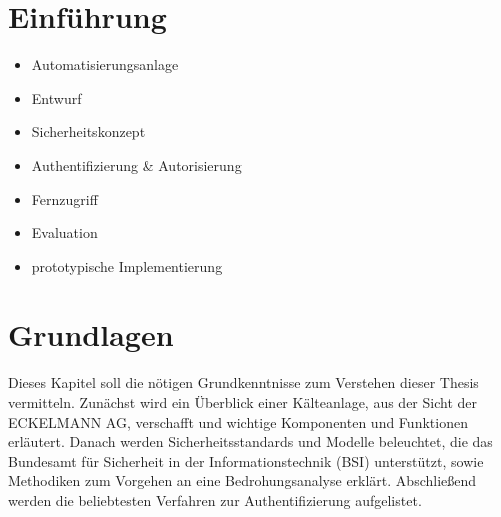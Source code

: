 \documentclass[11pt,a4paper]{report}
\begin{document}

\tableofcontents
\clearpage 


\chapter{Einführung} \label{chap:intro}

\begin{itemize}
\item Automatisierungsanlage
\item Entwurf 
\item Sicherheitskonzept
\item Authentifizierung \& Autorisierung
\item Fernzugriff
\item Evaluation
\item prototypische Implementierung
\end{itemize}

\chapter{Grundlagen} \label{chap:basics}

Dieses Kapitel soll die nötigen Grundkenntnisse zum Verstehen dieser Thesis vermitteln. Zunächst wird ein Überblick einer Kälteanlage, aus der Sicht der ECKELMANN AG, verschafft und wichtige Komponenten und Funktionen erläutert. Danach werden Sicherheitsstandards und Modelle beleuchtet, die das Bundesamt für Sicherheit in der Informationstechnik (BSI) unterstützt, sowie Methodiken zum Vorgehen an eine Bedrohungsanalyse erklärt. Abschließend werden die beliebtesten Verfahren zur Authentifizierung aufgelistet.
\end{document}
